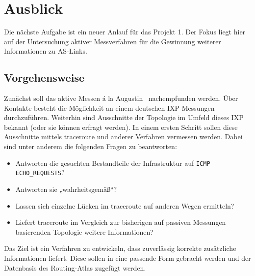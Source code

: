\section{Ausblick}\label{sec:ausblick}
Die nächste Aufgabe ist ein neuer Anlauf für das Projekt 1.
Der Fokus liegt hier auf der Untersuchung aktiver Messverfahren für die Gewinnung weiterer Informationen zu AS-Links.

\subsection{Vorgehensweise}
Zunächst soll das aktive Messen á la Augustin~\cite{Augustin:2009:IM:1644893.1644934} nachempfunden werden.
Über Kontakte besteht die Möglichkeit an einem deutschen IXP Messungen durchzuführen.
Weiterhin sind Ausschnitte der Topologie im Umfeld dieses IXP bekannt (oder sie können erfragt werden).
In einem ersten Schritt sollen diese Ausschnitte mittels traceroute und anderer Verfahren vermessen werden.
Dabei sind unter anderem die folgenden Fragen zu beantworten:
\begin{itemize}
  \item Antworten die gesuchten Bestandteile der Infrastruktur auf \texttt{ICMP ECHO\_REQUESTS}?
  \item Antworten sie „wahrheitsgemäß“?
  \item Lassen sich einzelne Lücken im traceroute auf anderen Wegen ermitteln?
  \item Liefert traceroute im Vergleich zur bisherigen auf passiven Messungen basierenden Topologie weitere Informationen?
\end{itemize}

Das Ziel ist ein Verfahren zu entwickeln, dass zuverlässig korrekte zusätzliche Informationen liefert.
Diese sollen in eine passende Form gebracht werden und der Datenbasis des Routing-Atlas zugefügt werden.
